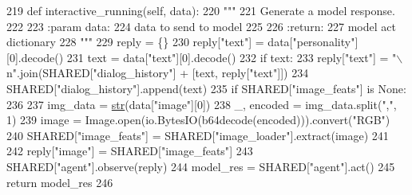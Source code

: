 \begin{DoxyCode}
219     \textcolor{keyword}{def }interactive\_running(self, data):
220         \textcolor{stringliteral}{"""}
221 \textcolor{stringliteral}{        Generate a model response.}
222 \textcolor{stringliteral}{}
223 \textcolor{stringliteral}{        :param data:}
224 \textcolor{stringliteral}{            data to send to model}
225 \textcolor{stringliteral}{}
226 \textcolor{stringliteral}{        :return:}
227 \textcolor{stringliteral}{            model act dictionary}
228 \textcolor{stringliteral}{        """}
229         reply = \{\}
230         reply[\textcolor{stringliteral}{"text"}] = data[\textcolor{stringliteral}{"personality"}][0].decode()
231         text = data[\textcolor{stringliteral}{"text"}][0].decode()
232         \textcolor{keywordflow}{if} text:
233             reply[\textcolor{stringliteral}{"text"}] = \textcolor{stringliteral}{"\(\backslash\)n"}.join(SHARED[\textcolor{stringliteral}{"dialog\_history"}] + [text, reply[\textcolor{stringliteral}{"text"}]])
234             SHARED[\textcolor{stringliteral}{"dialog\_history"}].append(text)
235         \textcolor{keywordflow}{if} SHARED[\textcolor{stringliteral}{"image\_feats"}] \textcolor{keywordflow}{is} \textcolor{keywordtype}{None}:
236 
237             img\_data = \hyperlink{namespacegenerate__task__READMEs_a5b88452ffb87b78c8c85ececebafc09f}{str}(data[\textcolor{stringliteral}{"image"}][0])
238             \_, encoded = img\_data.split(\textcolor{stringliteral}{","}, 1)
239             image = Image.open(io.BytesIO(b64decode(encoded))).convert(\textcolor{stringliteral}{"RGB"})
240             SHARED[\textcolor{stringliteral}{"image\_feats"}] = SHARED[\textcolor{stringliteral}{"image\_loader"}].extract(image)
241 
242         reply[\textcolor{stringliteral}{"image"}] = SHARED[\textcolor{stringliteral}{"image\_feats"}]
243         SHARED[\textcolor{stringliteral}{"agent"}].observe(reply)
244         model\_res = SHARED[\textcolor{stringliteral}{"agent"}].act()
245         \textcolor{keywordflow}{return} model\_res
246 
\end{DoxyCode}
\mbox{\label{classprojects_1_1image__chat_1_1interactive_1_1MyHandler_a8c651ac02abcedfd49fd7b89128ee737}} 
